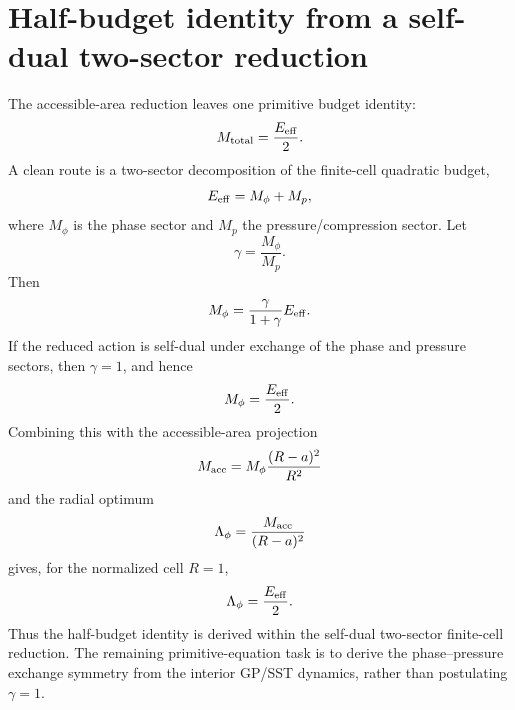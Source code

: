 \section{Half-budget identity from a self-dual two-sector reduction}
\label{app:half-budget-self-duality}

The accessible-area reduction leaves one primitive budget identity:
\[
  M_{\rm total}=\frac{E_{\rm eff}}{2}.
\]
A clean route is a two-sector decomposition of the finite-cell quadratic
budget,
\[
  E_{\rm eff}=M_\phi+M_p,
\]
where \(M_\phi\) is the phase sector and \(M_p\) the pressure/compression
sector.  Let
\[
  \gamma=\frac{M_\phi}{M_p}.
\]
Then
\[
  M_\phi=\frac{\gamma}{1+\gamma}E_{\rm eff}.
\]
If the reduced action is self-dual under exchange of the phase and pressure
sectors, then \(\gamma=1\), and hence
\[
  M_\phi=\frac{E_{\rm eff}}{2}.
\]
Combining this with the accessible-area projection
\[
  M_{\rm acc}=M_\phi\frac{(R-a)^2}{R^2}
\]
and the radial optimum
\[
  \Lambda_\phi=\frac{M_{\rm acc}}{(R-a)^2}
\]
gives, for the normalized cell \(R=1\),
\[
  \Lambda_\phi=\frac{E_{\rm eff}}{2}.
\]
Thus the half-budget identity is derived within the self-dual two-sector
finite-cell reduction.  The remaining primitive-equation task is to derive the
phase--pressure exchange symmetry from the interior GP/SST dynamics, rather
than postulating \(\gamma=1\).
